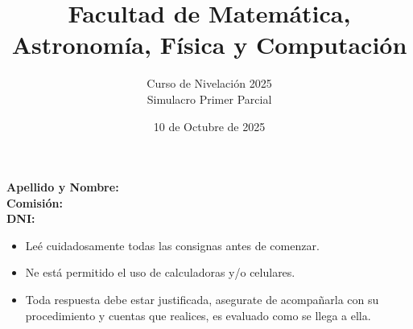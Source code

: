 \documentclass[a4paper]{article}
\title{Facultad de Matemática, Astronomía, Física y Computación}
\author{Curso de Nivelación 2025\\Simulacro Primer Parcial}
\date{10 de Octubre de 2025}
\begin{document}
\maketitle
\noindent\textbf{Apellido y Nombre:}\\
\textbf{Comisión:}\\
\textbf{DNI:}
\begin{itemize}
        \item Leé cuidadosamente todas las consignas antes de comenzar.
        \item Ne está permitido el uso de calculadoras y/o celulares.
        \item Toda respuesta debe estar justificada, asegurate de acompañarla con su procedimiento y cuentas que realices, es evaluado como se llega a ella.
\end{itemize}
\end{document}
